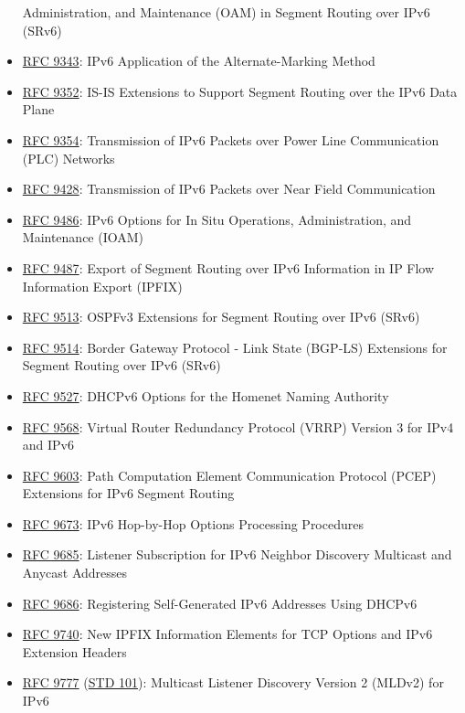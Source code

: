 \documentclass[
]{article}
\begin{document}
\begin{itemize}
  Administration, and Maintenance (OAM) in Segment Routing over IPv6
  (SRv6)
\item
  \href{https://www.rfc-editor.org/info/rfc9343}{RFC 9343}: IPv6
  Application of the Alternate-Marking Method
\item
  \href{https://www.rfc-editor.org/info/rfc9352}{RFC 9352}: IS-IS
  Extensions to Support Segment Routing over the IPv6 Data Plane
\item
  \href{https://www.rfc-editor.org/info/rfc9354}{RFC 9354}: Transmission
  of IPv6 Packets over Power Line Communication (PLC) Networks
\item
  \href{https://www.rfc-editor.org/info/rfc9428}{RFC 9428}: Transmission
  of IPv6 Packets over Near Field Communication
\item
  \href{https://www.rfc-editor.org/info/rfc9486}{RFC 9486}: IPv6 Options
  for In Situ Operations, Administration, and Maintenance (IOAM)
\item
  \href{https://www.rfc-editor.org/info/rfc9487}{RFC 9487}: Export of
  Segment Routing over IPv6 Information in IP Flow Information Export
  (IPFIX)
\item
  \href{https://www.rfc-editor.org/info/rfc9513}{RFC 9513}: OSPFv3
  Extensions for Segment Routing over IPv6 (SRv6)
\item
  \href{https://www.rfc-editor.org/info/rfc9514}{RFC 9514}: Border
  Gateway Protocol - Link State (BGP-LS) Extensions for Segment Routing
  over IPv6 (SRv6)
\item
  \href{https://www.rfc-editor.org/info/rfc9527}{RFC 9527}: DHCPv6
  Options for the Homenet Naming Authority
\item
  \href{https://www.rfc-editor.org/info/rfc9568}{RFC 9568}: Virtual
  Router Redundancy Protocol (VRRP) Version 3 for IPv4 and IPv6
\item
  \href{https://www.rfc-editor.org/info/rfc9603}{RFC 9603}: Path
  Computation Element Communication Protocol (PCEP) Extensions for IPv6
  Segment Routing
\item
  \href{https://www.rfc-editor.org/info/rfc9673}{RFC 9673}: IPv6
  Hop-by-Hop Options Processing Procedures
\item
  \href{https://www.rfc-editor.org/info/rfc9685}{RFC 9685}: Listener
  Subscription for IPv6 Neighbor Discovery Multicast and Anycast
  Addresses
\item
  \href{https://www.rfc-editor.org/info/rfc9686}{RFC 9686}: Registering
  Self-Generated IPv6 Addresses Using DHCPv6
\item
  \href{https://www.rfc-editor.org/info/rfc9740}{RFC 9740}: New IPFIX
  Information Elements for TCP Options and IPv6 Extension Headers
\item
  \href{https://www.rfc-editor.org/info/rfc9777}{RFC 9777}
  (\href{https://www.rfc-editor.org/info/std101}{STD 101}): Multicast
  Listener Discovery Version 2 (MLDv2) for IPv6
\end{itemize}
\end{document}
